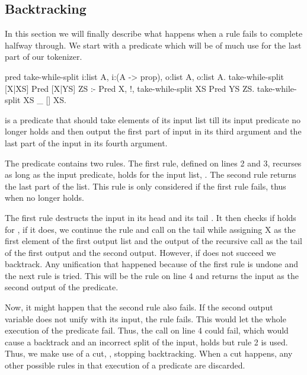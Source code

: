 \documentclass[thesis.tex]{subfiles}
\begin{document}
{{\subsection{Backtracking} \label{sssec:backtracking}
In this section we will finally describe what happens when a rule fails to complete halfway through. We start with a predicate which will be of much use for the last part of our tokenizer.
\begin{elpicode}
  pred take-while-split i:list A, i:(A -> prop), 
                        o:list A, o:list A.
  take-while-split [X|XS] Pred [X|YS] ZS :- Pred X, !,
    take-while-split XS Pred YS ZS.
  take-while-split XS _ [] XS.
\end{elpicode}
 is a predicate that should take elements of its input list till its input predicate no longer holds and then output the first part of input in its third argument and the last part of the input in its fourth argument.

The predicate contains two rules. The first rule, defined on lines 2 and 3, recurses as long as the input predicate,  holds for the input list, \elpii{[X|XS]}. The second rule returns the last part of the list. This rule is only considered if the first rule fails, thus when  no longer holds.

The first rule destructs the input in its head  and its tail . It then checks if  holds for , if it does, we continue the rule and call  on the tail while assigning X as the first element of the first output list and the output of the recursive call as the tail of the first output and the second output. However, if  does not succeed we backtrack. Any unification that happened because of the first rule is undone and the next rule is tried. This will be the rule on line 4 and returns the input as the second output of the predicate.

Now, it might happen that the second rule also fails. If the second output variable does not unify with its input, the rule fails. This would let the whole execution of the predicate fail. Thus, the call on line 4 could fail, which would cause a backtrack and an incorrect split of the input,  holds but rule 2 is used. Thus, we make use of a cut, \elpii{!}, stopping backtracking. When a cut happens, any other possible rules in that execution of a predicate are discarded.

}}
\end{document}
